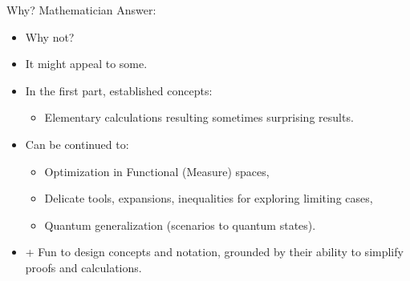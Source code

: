 \documentclass{beamer}
\theoremstyle{definition}
\begin{document}
\begin{frame}{Why? Mathematician Answer:}

\begin{itemize}
    \item Why not?
    \item It might appeal to some.
    \item In the first part, established concepts:
    \begin{itemize}
        \item Elementary calculations resulting sometimes surprising results.
    \end{itemize}
    \item Can be continued to:
    \begin{itemize}
        \item Optimization in Functional (Measure) spaces,
        \item Delicate tools, expansions, inequalities for exploring limiting cases,
        \item Quantum generalization (scenarios to quantum states).
    \end{itemize}
    \item + Fun to design concepts and notation, grounded by their ability to simplify proofs and calculations.
\end{itemize}



\end{frame}
\end{document}
